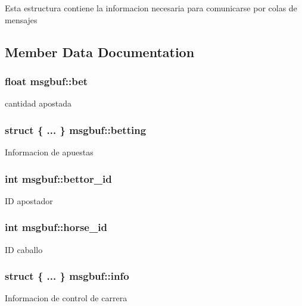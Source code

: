 Esta estructura contiene la informacion necesaria para comunicarse por colas de mensajes 

\subsection{Member Data Documentation}
\subsubsection[{\texorpdfstring{bet}{bet}}]{\setlength{\rightskip}{0pt plus 5cm}float msgbuf\+::bet}\hypertarget{structmsgbuf_a39278db78542cbe8cf2df77ac5b8b080}{}\label{structmsgbuf_a39278db78542cbe8cf2df77ac5b8b080}
cantidad apostada 
\subsubsection[{\texorpdfstring{betting}{betting}}]{\setlength{\rightskip}{0pt plus 5cm}struct \{ ... \}  msgbuf\+::betting}\hypertarget{structmsgbuf_a1337d4cd36a0fa762c15244c00853381}{}\label{structmsgbuf_a1337d4cd36a0fa762c15244c00853381}
Informacion de apuestas 
\subsubsection[{\texorpdfstring{bettor\+\_\+id}{bettor_id}}]{\setlength{\rightskip}{0pt plus 5cm}int msgbuf\+::bettor\+\_\+id}\hypertarget{structmsgbuf_a4d6daa3e4bf410b275b596b1e6828110}{}\label{structmsgbuf_a4d6daa3e4bf410b275b596b1e6828110}
ID apostador 
\subsubsection[{\texorpdfstring{horse\+\_\+id}{horse_id}}]{\setlength{\rightskip}{0pt plus 5cm}int msgbuf\+::horse\+\_\+id}\hypertarget{structmsgbuf_a2d569f43a4859884c21c9ce8f1408eeb}{}\label{structmsgbuf_a2d569f43a4859884c21c9ce8f1408eeb}
ID caballo 
\subsubsection[{\texorpdfstring{info}{info}}]{\setlength{\rightskip}{0pt plus 5cm}struct \{ ... \}  msgbuf\+::info}\hypertarget{structmsgbuf_ad43d12674488c373d8fb69efed53c3cc}{}\label{structmsgbuf_ad43d12674488c373d8fb69efed53c3cc}
Informacion de control de carrera 
